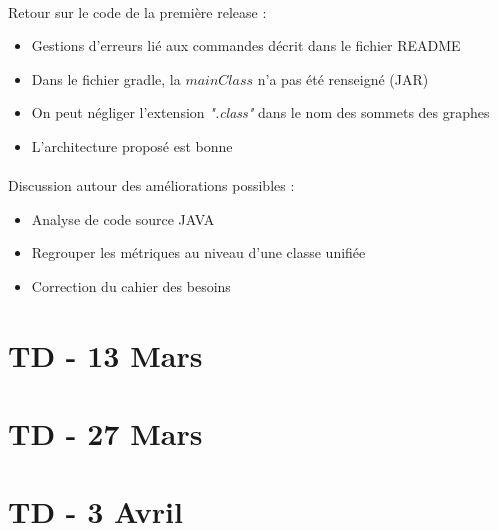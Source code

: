 \documentclass{scrartcl}
\begin{document}
\paragraph{}Retour sur le code de la première release :
\begin{itemize}
    \item Gestions d'erreurs lié aux commandes décrit dans le fichier README
    \item Dans le fichier gradle, la $mainClass$ n'a pas été renseigné (JAR)
    \item On peut négliger l'extension \textit{".class"} dans le nom des sommets des graphes
    \item L'architecture proposé est bonne
\end{itemize}

\paragraph{}Discussion autour des améliorations possibles :
\begin{itemize}
    \item Analyse de code source JAVA
    \item Regrouper les métriques au niveau d'une classe unifiée
    \item Correction du cahier des besoins
\end{itemize}

\section{TD - 13 Mars}

\section{TD - 27 Mars}

\section{TD - 3 Avril}
\end{document}
